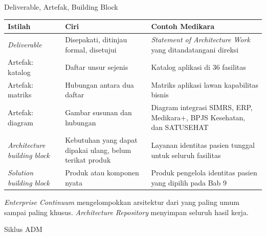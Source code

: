 \documentclass[aspectratio=169, table, 12pt]{beamer}
\begin{document}
\begin{frame}{{\Large Deliverable, Artefak, Building Block}}
  \scriptsize
  \begin{tabularx}{\textwidth}{>{\raggedright\arraybackslash}p{3.0cm}
      >{\raggedright\arraybackslash}p{4.3cm} >{\raggedright\arraybackslash}X}
    \hline
    \textbf{Istilah} & \textbf{Ciri} & \textbf{Contoh Medikara} \\
    \hline
    \textit{Deliverable} & Disepakati, ditinjau formal, disetujui & \textit{Statement of Architecture Work} yang ditandatangani direksi \\
    \hline
    Artefak: katalog & Daftar unsur sejenis & Katalog aplikasi di 36 fasilitas \\
    \hline
    Artefak: matriks & Hubungan antara dua daftar & Matriks aplikasi lawan kapabilitas bisnis \\
    \hline
    Artefak: diagram & Gambar susunan dan hubungan & Diagram integrasi SIMRS, ERP, Medikara+, BPJS Kesehatan, dan SATUSEHAT \\
    \hline
    \textit{Architecture building block} & Kebutuhan yang dapat dipakai ulang, belum terikat produk & Layanan identitas pasien tunggal untuk seluruh fasilitas \\
    \hline
    \textit{Solution building block} & Produk atau komponen nyata & Produk pengelola identitas pasien yang dipilih pada Bab 9 \\
    \hline
  \end{tabularx}

  \vspace{6pt}
  \small \textit{Enterprise Continuum} mengelompokkan arsitektur dari yang paling umum sampai paling
  khusus. \textit{Architecture Repository} menyimpan seluruh hasil kerja.
\end{frame}

\begin{frame}{{\Large Siklus ADM}}
  \centering
\end{frame}
\end{document}
